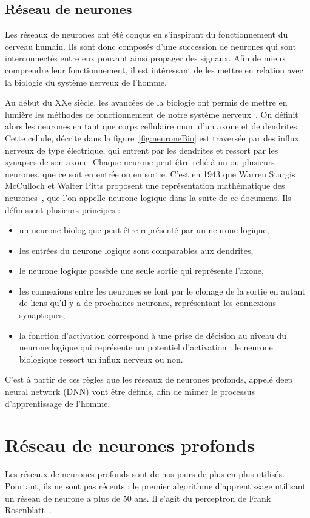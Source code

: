 \subsection{Réseau de neurones}
Les réseaux de neurones ont été conçus en s'inspirant du fonctionnement du cerveau humain. Ils sont donc composés d'une succession de neurones qui sont interconnectés entre eux pouvant ainsi propager des signaux.
Afin de mieux comprendre leur fonctionnement, il est intéressant de les mettre en relation avec la biologie du système nerveux de l'homme.


Au début du XXe siècle, les avancées de la biologie ont permis de mettre en lumière les méthodes de fonctionnement de notre système nerveux~\cite{Cajal1906}. On définit alors les neurones en tant que corps cellulaire muni d’un axone et de dendrites. Cette cellule, décrite dans la figure~\ref{fig:neuroneBio} est traversée par des influx nerveux de type électrique, qui entrent par les dendrites et ressort par les synapses de son axone. Chaque neurone peut être relié à un ou plusieurs neurones, que ce soit en entrée ou en sortie.
C'est en 1943 que Warren Sturgis McCulloch et Walter Pitts proposent une représentation mathématique des neurones~\cite{McCulloch1943}, que l'on appelle neurone logique dans la suite de ce document. Ils définissent plusieurs principes :
\begin{itemize}
  \item un neurone biologique peut être représenté par un neurone logique,
  \item les entrées du neurone logique sont comparables aux dendrites,
  \item le neurone logique possède une seule sortie qui représente l'axone,
  \item les connexions entre les neurones se font par le clonage de la sortie en autant de liens qu'il y a de prochaines neurones, représentant les connexions synaptiques,
  \item la fonction d'activation correspond à une prise de décision au niveau du neurone logique qui représente un potentiel d'activation : le neurone biologique ressort un influx nerveux ou non.
\end{itemize}
C'est à partir de ces règles que les réseaux de neurones profonds, appelé deep neural network (DNN) vont être définis, afin de mimer le processus d'apprentissage de l'homme.

\section{Réseau de neurones profonds}
Les réseaux de neurones profonds sont de nos jours de plus en plus utilisés. Pourtant, ils ne sont pas récents : le premier algorithme d'apprentissage utilisant un réseau de neurone a plus de 50 ans. Il s'agit du perceptron de Frank Rosenblatt~\cite{Rosenblatt1957}.

